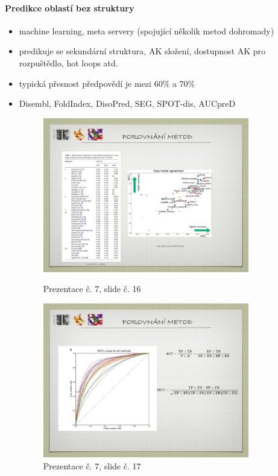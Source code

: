 \documentclass[DIV=8]{scrreprt}
\begin{document}
\paragraph{Predikce oblastí bez struktury}
\begin{itemize}[nosep]
    \item machine learning, meta servery (spojující několik metod dohromady)
    \item predikuje se sekundární struktura, AK složení, dostupnost AK pro rozpuštědlo, hot loops atd.
    \item typická přesnost předpovědí je mezi 60\% a 70\%
    \item Disembl, FoldIndex, DisoPred, SEG, SPOT-dis, AUCpreD \begin{figure}
    \caption{Prezentace č. 7, slide č. 16}
    \includegraphics[width=0.85\textwidth]{slides-7/slide-16.jpg}
    \centering
    \label{slides-7-slide-16}
\end{figure}
\begin{figure}
    \caption{Prezentace č. 7, slide č. 17}
    \includegraphics[width=0.85\textwidth]{slides-7/slide-17.jpg}

\end{figure}
\end{itemize}
\end{document}
